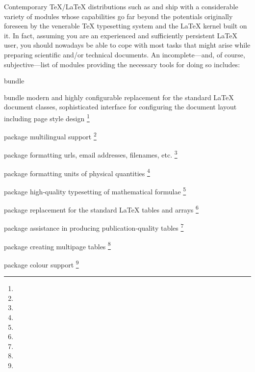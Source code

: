 Contemporary \TeX/\LaTeX{} distributions such as \TeXLive{} and \MiKTeX{}
ship with a considerable variety of modules whose capabilities go far
beyond the potentials originally foreseen by the venerable \TeX{}
typesetting system and the \LaTeX{} kernel built on it. In fact, assuming
you are an experienced and sufficiently persistent \LaTeX{} user, you
should nowadays be able to cope with most tasks that might arise while
preparing scientific and/or technical documents.  An incomplete---and, of
course, subjective---list of modules providing the necessary tools for
doing so includes:
%
\begin{labeling}[→]{\KOMAScript{} bundle}
   \item[\KOMAScript{} bundle]%
      modern and highly configurable replacement for the standard \LaTeX{}
      document classes, sophisticated interface for configuring the document
      layout including page style design%
      \footnote{}
   \item[\entity{babel} package]%
      multilingual support%
      \footnote{}
   \item[\entity{url} package]%
      formatting \acp{url}, email addresses, filenames, etc.%
      \footnote{}
   \item[\entity{siunitx} package]%
      formatting units of physical quantities%
      \footnote{}
   \item[\entity{amsmath} package]%
      high‐quality typesetting of mathematical formulae%
      \footnote{}
   \item[\entity{array} package]%
      replacement for the standard \LaTeX{} tables and arrays%
      \footnote{}
   \item[\entity{booktabs} package]%
      assistance in producing publication‐quality tables%
      \footnote{}
   \item[\entity{longtable} package]%
      creating multipage tables%
      \footnote{}
   \item[\entity{xcolor} package]%
      colour support%
      \footnote{}

\end{labeling}
